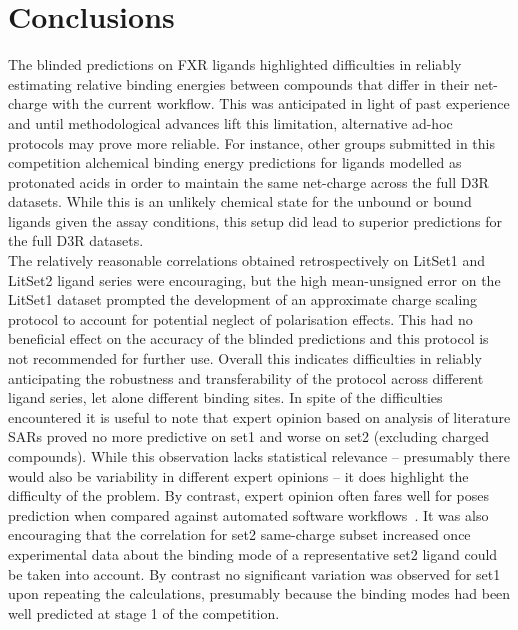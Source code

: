 \documentclass{svjour3}                     %
\begin{document}
\section{Conclusions}
\label{sec:conclusion}
The blinded predictions on FXR ligands highlighted difficulties in reliably estimating relative binding energies between compounds that differ in their net-charge with the current workflow. This was anticipated in light of past experience and until methodological advances lift this limitation, alternative ad-hoc protocols may prove more reliable. For instance, other groups submitted in this competition alchemical binding energy predictions for ligands modelled as protonated acids in order to maintain the same net-charge across the full D3R datasets. While this is an unlikely chemical state for the unbound or bound ligands given the assay conditions, this setup did lead to superior predictions for the full D3R datasets. 
\\
The relatively reasonable correlations obtained retrospectively on LitSet1 and LitSet2 ligand series were encouraging, but the high mean-unsigned error on the LitSet1 dataset prompted the development of an approximate charge scaling protocol to account for potential neglect of polarisation effects.  This had no beneficial effect on the accuracy of the blinded predictions and this protocol is not recommended for further use. Overall this indicates difficulties in reliably anticipating the robustness and transferability of the protocol across different ligand series, let alone different binding sites. In spite of the difficulties encountered it is useful to note that expert opinion based on analysis of literature SARs proved no more predictive on set1 and worse on set2 (excluding charged compounds). While this observation lacks statistical relevance -- presumably there would also be variability in different expert opinions -- it does highlight the difficulty of the problem. By contrast, expert opinion often fares well for poses prediction when compared against automated software workflows~\cite{MeyJuarez-JimenezHennessyEtAl2016,KennethM.MerzJr.2010}. It was also encouraging that the correlation for set2 same-charge subset increased once experimental data about the binding mode of a representative set2 ligand could be taken into account. By contrast no significant variation was observed for set1 upon repeating the calculations, presumably because the binding modes had been well predicted at stage 1 of the competition. 
\\
\end{document}
